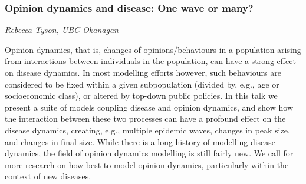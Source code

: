 \subsubsection*{Opinion dynamics and disease: One wave or many?}

\textit{Rebecca Tyson, UBC Okanagan}

Opinion dynamics, that is, changes of opinions/behaviours in a
population arising from interactions between individuals in the
population, can have a strong effect on disease dynamics. In most
modelling efforts however, such behaviours are considered to be fixed
within a given subpopulation (divided by, e.g., age or socioeconomic
class), or altered by top-down public policies. In this talk we present
a suite of models coupling disease and opinion dynamics, and show how
the interaction between these two processes can have a profound effect
on the disease dynamics, creating, e.g., multiple epidemic waves,
changes in peak size, and changes in final size. While there is a long
history of modelling disease dynamics, the field of opinion dynamics
modelling is still fairly new. We call for more research on how best to
model opinion dynamics, particularly within the context of new diseases.
